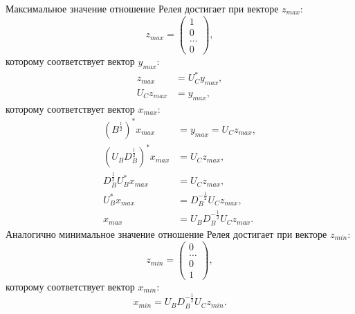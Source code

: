 Максимальное значение отношение Релея достигает при векторе $z_{max}$:
\[
    z_{max}
    = \begin{pmatrix}
          1     \\
          0     \\
          \dots \\
          0
    \end{pmatrix} ,
\]
которому соответствует вектор $y_{max}$:
\begin{align*}
    z_{max} & = U_C^* y_{max} , \\
    U_C z_{max} & = y_{max} ,
\end{align*}
которому соответствует вектор $x_{max}$:
\begin{align*}
    \left ( B^\frac{1}{2} \right )^* x_{max} & = y_{max} = U_C z_{max} , \\
    \left ( U_B D_B^\frac{1}{2} \right )^* x_{max} & = U_C z_{max} , \\
    D_B^\frac{1}{2} U_B^* x_{max} & = U_C z_{max} , \\
    U_B^* x_{max} & = D_B^{-\frac{1}{2}} U_C z_{max} , \\
    x_{max} & = U_B D_B^{-\frac{1}{2}} U_C z_{max} .
\end{align*}
Аналогично минимальное значение отношение Релея достигает при векторе $z_{min}$:
\[
    z_{min}
    = \begin{pmatrix}
          0     \\
          \dots \\
          0     \\
          1
    \end{pmatrix} ,
\]
которому соответствует вектор $x_{min}$:
\[
    x_{min} = U_B D_B^{-\frac{1}{2}} U_C z_{min} .
\]